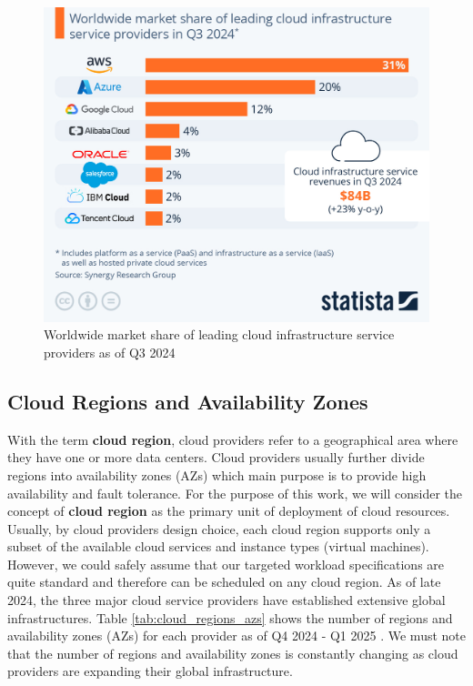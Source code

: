 \begin{figure}[t]
    \centering
    \includegraphics[width=0.75\linewidth]{images/pcp.jpeg}
    \caption{Worldwide market share of leading cloud infrastructure service providers as of Q3 2024 \cite{statista_cloud_market_share}}
    \label{fig:pcp}
\end{figure}
  
\subsection{Cloud Regions and Availability Zones}

With the term \textbf{cloud region}, cloud providers refer to a geographical area where they have one or more data centers.
Cloud providers usually further divide regions into availability zones (AZs) which main purpose is to provide high availability and fault tolerance.
For the purpose of this work, we will consider the concept of \textbf{cloud region} as the primary unit of deployment of cloud resources.
Usually, by cloud providers design choice, each cloud region supports only a subset of the available cloud services and instance types (virtual machines).
However, we could safely assume that our targeted workload specifications are quite standard and therefore can be scheduled on any cloud region.
As of late 2024, the three major cloud service providers have established extensive global infrastructures.
Table \ref{tab:cloud_regions_azs} shows the number of regions and availability zones (AZs) for each provider as of Q4 2024 - Q1 2025
\cite{statista_cloud_regions} \cite{aws_infrastructure}.
We must note that the number of regions and availability zones is constantly changing as cloud providers are expanding their global infrastructure.

